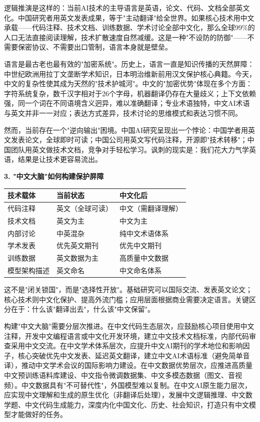逻辑推演是这样的：当前AI技术的主导语言是英语，论文、代码、文档全部英文化。中国研究者用英文发表成果，等于"主动翻译"给全世界。如果核心技术用中文承载——代码注释、技术文档、训练数据、学术讨论全部中文化，那么全球99\%的人口无法直接阅读理解，技术扩散速度自然减缓。这是一种"不设防的防御"——不需要保密协议、不需要出口管制，语言本身就是壁垒。

语言是最古老也最有效的"加密系统"。历史上，语言一直是知识传播的天然屏障：中世纪欧洲用拉丁文垄断学术知识，日本明治维新前用汉文保护核心典籍。今天，中文的复杂性使其成为天然的"技术护城河"。中文的"加密优势"体现在多个方面：字符系统复杂，数千汉字相对于26个字母，机器翻译仍存在大量歧义；上下文依赖强，同一个词在不同语境含义迥异，难以准确翻译；专业术语独特，中文AI术语与英文并非一一对应；表达方式差异，技术讨论的思维模式和表达习惯不同。

然而，当前存在一个"逆向输出"困境。中国AI研究呈现出一个悖论：中国学者用英文发表论文，全球即时可读；中国公司用英文写代码注释，开源即"技术转移"；中国团队用英文做技术文档，竞争对手轻松学习。讽刺的现实是：我们花大力气学英语，结果是让技术更容易流出。

\textbf{3. "中文大脑"如何构建保护屏障}

\begin{center}
\begin{tabular}{l|l|l}
\textbf{技术载体} & \textbf{当前状态} & \textbf{中文化后} \\
\hline
代码注释 & 英文（全球可读） & 中文（需翻译理解） \\
技术文档 & 英文为主 & 中文为主 \\
内部讨论 & 中英混杂 & 纯中文术语体系 \\
学术发表 & 优先英文期刊 & 优先中文期刊 \\
训练数据 & 英文数据为主 & 高质量中文数据 \\
模型架构描述 & 英文命名 & 中文命名体系 \\
\end{tabular}
\end{center}

这不是"闭关锁国"，而是"选择性开放"。基础研究可以国际交流、发表英文论文；核心技术则中文化保护、提高外流门槛；应用层面根据商业需要决定语言。关键区分在于：什么该"翻译出去"，什么该"中文保留"。

构建"中文大脑"需要分层次推进。在中文代码生态层次，应鼓励核心项目使用中文注释，开发中文编程语言或中文化开发环境，建立中文技术文档标准，内部代码审查采用中文交流。在中文学术体系层次，应提升中文AI期刊的学术地位和影响因子，核心突破优先中文发表、延迟英文翻译，建立中文AI术语标准（避免简单音译），推动中文学术会议的国际影响力建设。在中文数据优势层次，应推进高质量中文预训练语料库建设、中文指令微调数据集、中文多模态数据（图文、音视频）。中文数据具有"不可替代性"，外国模型难以复制。在中文AI原生能力层次，应实现中文理解和生成的原生优化（非翻译后处理），发展中文逻辑推理、中文数学题、中文代码生成能力，深度内化中国文化、历史、社会知识，打造只有中文模型才能做好的任务。

